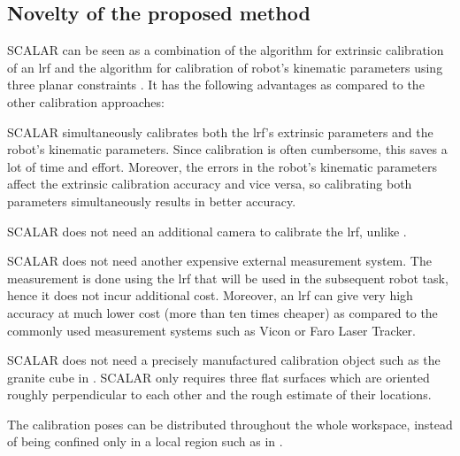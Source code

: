 \subsection{Novelty of the proposed method}
\label{sec:novelty}
SCALAR can be seen as a combination of the algorithm for extrinsic calibration of an \ac{lrf} \cite{Zhang2004} and the algorithm for calibration of robot's kinematic parameters using three planar constraints \cite{Joubair2015}. It has the following advantages as compared to the other calibration approaches:
\begin{compactenum}
\item SCALAR simultaneously calibrates both the \ac{lrf}'s extrinsic parameters and the robot's kinematic parameters. Since calibration is often cumbersome, this saves a lot of time and effort. Moreover, the errors in the robot's kinematic parameters affect the extrinsic calibration accuracy and vice versa, so calibrating both parameters simultaneously results in better accuracy. 
\item SCALAR does not need an additional camera to calibrate the \ac{lrf}, unlike \cite{Zhang2004}.
\item SCALAR does not need another expensive external measurement system. The measurement is done using the \ac{lrf} that will be used in the subsequent robot task, hence it does not incur additional cost. Moreover, an \ac{lrf} can give very high accuracy at much lower cost (more than ten times cheaper) as compared to the commonly used measurement systems such as Vicon or Faro Laser Tracker. 
\item SCALAR does not need a precisely manufactured calibration object such as the granite cube in \cite{Joubair2015}. SCALAR only requires three flat surfaces which are oriented roughly perpendicular to each other and the rough estimate of their locations. 
\item The calibration poses can be distributed throughout the whole workspace, instead of being confined only in a local region such as in \cite{Joubair2015}. 
\end{compactenum}



